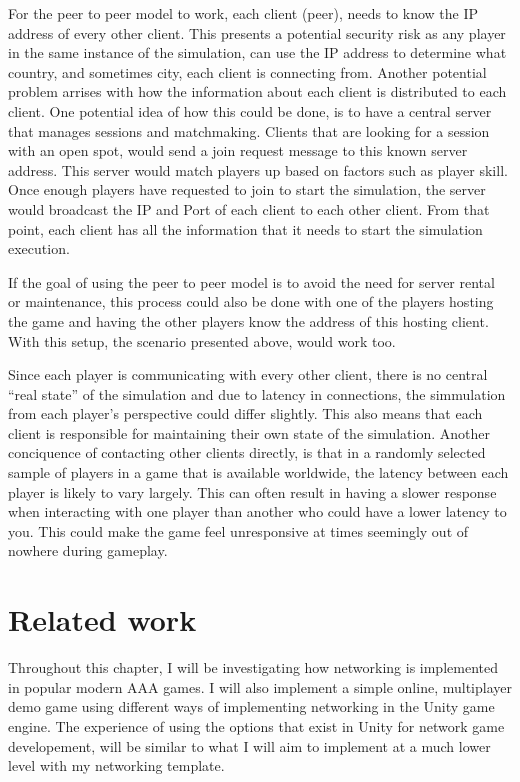 For the peer to peer model to work, each client (peer), needs to know the IP address of every other client. This presents a potential security risk as any player in the same instance of the simulation, can use the IP address to determine what country, and sometimes city, each client is connecting from. Another potential problem arrises with how the information about each client is distributed to each client. One potential idea of how this could be done, is to have a central server that manages sessions and matchmaking. Clients that are looking for a session with an open spot, would send a join request message to this known server address. This server would match players up based on factors such as player skill. Once enough players have requested to join to start the simulation, the server would broadcast the IP and Port of each client to each other client. From that point, each client has all the information that it needs to start the simulation execution.

If the goal of using the peer to peer model is to avoid the need for server rental or maintenance, this process could also be done with one of the players hosting the game and having the other players know the address of this hosting client. With this setup, the scenario presented above, would work too.

Since each player is communicating with every other client, there is no central ``real state'' of the simulation and due to latency in connections, the simmulation from each player's perspective could differ slightly. This also means that each client is responsible for maintaining their own state of the simulation. Another conciquence of contacting other clients directly, is that in a randomly selected sample of players in a game that is available worldwide, the latency between each player is likely to vary largely. This can often result in having a slower response when interacting with one player than another who could have a lower latency to you. This could make the game feel unresponsive at times seemingly out of nowhere during gameplay.




\chapter{Related work}
Throughout this chapter, I will be investigating how networking is implemented in popular modern AAA games. I will also implement a simple online, multiplayer demo game using different ways of implementing networking in the Unity game engine. The experience of using the options that exist in Unity for network game developement, will be similar to what I will aim to implement at a much lower level with my networking template.


